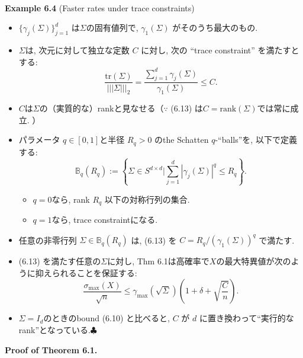 \documentclass[unicode,aspectratio=169,11pt]{beamer}
\def\endexample{\hfill $\clubsuit$}
\newcommand{\bb}{\mathbb}
\newcommand{\trace}{\mathrm{tr}}
\begin{document}
\begin{frame}{}{}
　\\
{\bf Example 6.4} (Faster rates under trace constraints)
\begin{itemize}
  \item $\{ \gamma_j(\Sigma)\}_{j = 1}^d$ は$\Sigma$の固有値列で, $\gamma_1(\Sigma)$ がそのうち最大のもの.
  \item $\Sigma$は, 次元に対して独立な定数 $C$ に対し, 次の ``trace constraint'' を満たすとする:
        \[
            \frac{\trace(\Sigma)}{|||\Sigma|||_2}
            = \frac{\sum_{j=1}^d \gamma_j(\Sigma)}{\gamma_1(\Sigma)}
            \le C.
            \tag{6.13}
        \]
  \item $C$は$\Sigma$の（実質的な）rankと見なせる（$\because$ (6.13) は$C = \mathrm{rank}(\Sigma)$では常に成立. ）
  \item パラメータ $q \in [0,1]$と半径 $R_q >0$ のthe Schatten $q$-``balls''を, 以下で定義する:
        \[
          \bb{B}_q(R_q)
          := \left\{ \Sigma\in S^{d \times d} \Bigg| \sum_{j=1}^d|\gamma_j(\Sigma)|^q \le R_q \right\}.
          \tag{6.14}
        \]
        \begin{itemize}
          \item $q = 0$なら, rank $R_q$ 以下の対称行列の集合.
          \item $q = 1$なら, trace constraintになる.
        \end{itemize}
  \item 任意の非零行列 $\Sigma \in \bb{B}_q(R_q)$ は, (6.13) を $C = R_q / (\gamma_1(\Sigma))^q$ で満たす.
\end{itemize}
\end{frame}

\begin{frame}{}
\begin{itemize}
  \item (6.13) を満たす任意の$\Sigma$に対し, Thm 6.1は高確率で$X$の最大特異値が次のように抑えられることを保証する:
  \[
      \frac{\sigma_{\max}(X)}{\sqrt{n}} \le \gamma_{\max}(\sqrt{\Sigma}) \left(1 + \delta + \sqrt{\frac{C}{n}}\right).
      \tag{6.15}
  \]
  \item $\Sigma = I_d$のときのbound (6.10) と比べると, $C$ が $d$ に置き換わって``実行的なrank''となっている.\endexample
\end{itemize}
\end{frame}

\begin{frame}{}{}
{\bf Proof of Theorem 6.1.}
\end{frame}
\end{document}

